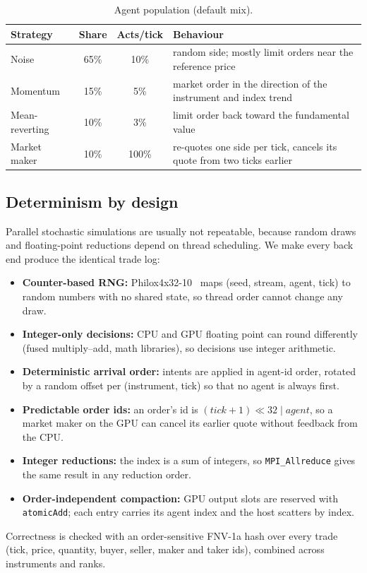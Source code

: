 \begin{table}[t]
\centering
\caption{Agent population (default mix).}
\label{tab:agents}
\footnotesize
\begin{tabularx}{\columnwidth}{@{}l c c X@{}}
\toprule
Strategy & Share & Acts/tick & Behaviour\\
\midrule
Noise & 65\% & 10\% & random side; mostly limit orders near the reference price\\
Momentum & 15\% & 5\% & market order in the direction of the instrument and index trend\\
Mean-reverting & 10\% & 3\% & limit order back toward the fundamental value\\
Market maker & 10\% & 100\% & re-quotes one side per tick, cancels its quote from two ticks earlier\\
\bottomrule
\end{tabularx}
\end{table}

\subsection{Determinism by design}
Parallel stochastic simulations are usually not repeatable, because random draws and floating-point
reductions depend on thread scheduling. We make every back end produce the identical trade log:
\begin{itemize}
\item \textbf{Counter-based RNG:} Philox4x32-10~\cite{salmon2011} maps (seed, stream, agent, tick)
  to random numbers with no shared state, so thread order cannot change any draw.
\item \textbf{Integer-only decisions:} CPU and GPU floating point can round differently (fused
  multiply--add, math libraries), so decisions use integer arithmetic.
\item \textbf{Deterministic arrival order:} intents are applied in agent-id order, rotated by a
  random offset per (instrument, tick) so that no agent is always first.
\item \textbf{Predictable order ids:} an order's id is $(\textit{tick}+1)\ll 32 \mid \textit{agent}$,
  so a market maker on the GPU can cancel its earlier quote without feedback from the CPU.
\item \textbf{Integer reductions:} the index is a sum of integers, so \texttt{MPI\_Allreduce} gives
  the same result in any reduction order.
\item \textbf{Order-independent compaction:} GPU output slots are reserved with
  \texttt{atomicAdd}; each entry carries its agent index and the host scatters by index.
\end{itemize}
Correctness is checked with an order-sensitive FNV-1a hash over every trade (tick, price,
quantity, buyer, seller, maker and taker ids), combined across instruments and ranks.

